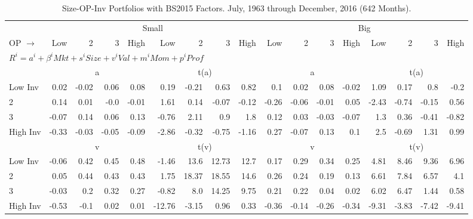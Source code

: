 
\begin{table}[!ht]
\centering
\caption{Size-OP-Inv Portfolios with BS2015 Factors. \footnotesize{July, 1963 through December, 2016 (642 Months).}}
\begin{tabular}{lrrrrrrrrrrrrrrrr}
  \toprule
    & \multicolumn{8}{c}{Small} & \multicolumn{8}{c}{Big} \\
      \cmidrule(r){2-9} \cmidrule(r){10-17}
    OP $\rightarrow$ & Low & 2 & 3 & High & Low & 2 & 3 & High & Low & 2 & 3 & High & Low & 2 & 3 & High \\ 
  \midrule
  \multicolumn{9}{l}{$R^i=a^i+\beta^iMkt+s^iSize+v^iVal+m^iMom+p^iProf$} \\

  
    
      & \multicolumn{4}{c}{a} & \multicolumn{4}{c}{t(a)}
    
      & \multicolumn{4}{c}{a} & \multicolumn{4}{c}{t(a)}
    
    \\
      \cmidrule(r){2-5} \cmidrule(r){6-9} \cmidrule(r){10-13} \cmidrule(r){14-17}

    Low Inv   & 0.02  & -0.02  & 0.06  & 0.08  & 0.19  & -0.21  & 0.63  & 0.82  & 0.1  & 0.02  & 0.08  & -0.02  & 1.09  & 0.17  & 0.8  & -0.2  \\
           2  & 0.14  & 0.01  & -0.0  & -0.01  & 1.61  & 0.14  & -0.07  & -0.12  & -0.26  & -0.06  & -0.01  & 0.05  & -2.43  & -0.74  & -0.15  & 0.56  \\
           3  & -0.07  & 0.14  & 0.06  & 0.13  & -0.76  & 2.11  & 0.9  & 1.8  & 0.12  & 0.03  & -0.03  & -0.07  & 1.3  & 0.36  & -0.41  & -0.82  \\
    High Inv  & -0.33  & -0.03  & -0.05  & -0.09  & -2.86  & -0.32  & -0.75  & -1.16  & 0.27  & -0.07  & 0.13  & 0.1  & 2.5  & -0.69  & 1.31  & 0.99  \\

  
    
      & \multicolumn{4}{c}{v} & \multicolumn{4}{c}{t(v)}
    
      & \multicolumn{4}{c}{v} & \multicolumn{4}{c}{t(v)}
    
    \\
      \cmidrule(r){2-5} \cmidrule(r){6-9} \cmidrule(r){10-13} \cmidrule(r){14-17}

    Low Inv   & -0.06  & 0.42  & 0.45  & 0.48  & -1.46  & 13.6  & 12.73  & 12.7  & 0.17  & 0.29  & 0.34  & 0.25  & 4.81  & 8.46  & 9.36  & 6.96  \\
           2  & 0.05  & 0.44  & 0.43  & 0.43  & 1.75  & 18.37  & 18.55  & 14.6  & 0.26  & 0.24  & 0.19  & 0.13  & 6.61  & 7.84  & 6.57  & 4.1  \\
           3  & -0.03  & 0.2  & 0.32  & 0.27  & -0.82  & 8.0  & 14.25  & 9.75  & 0.21  & 0.22  & 0.04  & 0.02  & 6.02  & 6.47  & 1.44  & 0.58  \\
    High Inv  & -0.53  & -0.1  & 0.02  & 0.01  & -12.76  & -3.15  & 0.96  & 0.33  & -0.36  & -0.14  & -0.26  & -0.34  & -9.31  & -3.83  & -7.42  & -9.41  \\


\end{tabular}
\end{table}
